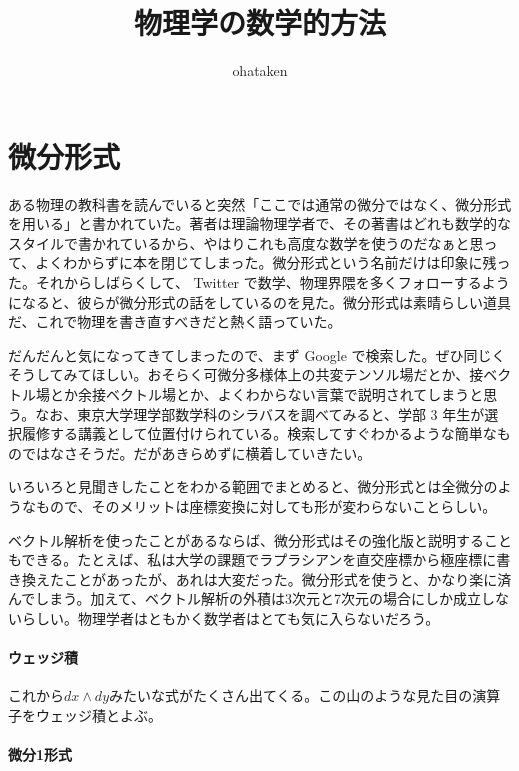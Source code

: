 \title{\huge 物理学の数学的方法}
\author{ohataken}
\maketitle

\newpage


\section{微分形式}

ある物理の教科書を読んでいると突然「ここでは通常の微分ではなく、微分形式を用いる」と書かれていた。著者は理論物理学者で、その著書はどれも数学的なスタイルで書かれているから、やはりこれも高度な数学を使うのだなぁと思って、よくわからずに本を閉じてしまった。微分形式という名前だけは印象に残った。それからしばらくして、 Twitter で数学、物理界隈を多くフォローするようになると、彼らが微分形式の話をしているのを見た。微分形式は素晴らしい道具だ、これで物理を書き直すべきだと熱く語っていた。

だんだんと気になってきてしまったので、まず Google で検索した。ぜひ同じくそうしてみてほしい。おそらく可微分多様体上の共変テンソル場だとか、接ベクトル場とか余接ベクトル場とか、よくわからない言葉で説明されてしまうと思う。なお、東京大学理学部数学科のシラバスを調べてみると、学部 3 年生が選択履修する講義として位置付けられている。検索してすぐわかるような簡単なものではなさそうだ。だがあきらめずに横着していきたい。

いろいろと見聞きしたことをわかる範囲でまとめると、微分形式とは全微分のようなもので、そのメリットは座標変換に対しても形が変わらないことらしい。

ベクトル解析を使ったことがあるならば、微分形式はその強化版と説明することもできる。たとえば、私は大学の課題でラプラシアンを直交座標から極座標に書き換えたことがあったが、あれは大変だった。微分形式を使うと、かなり楽に済んでしまう。加えて、ベクトル解析の外積は3次元と7次元の場合にしか成立しないらしい。物理学者はともかく数学者はとても気に入らないだろう。

\hrulefill

\paragraph{ウェッジ積}

これから$ dx \wedge dy $みたいな式がたくさん出てくる。この山のような見た目の演算子をウェッジ積とよぶ。

\paragraph{微分1形式}

